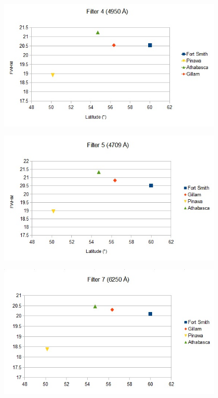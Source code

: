 \documentclass[11pt]{article}
\begin{document}
\begin{figure}[h!]
\includegraphics[scale=1.0]{filter4_FWHM.jpg}
\end{figure}

\begin{figure}[h!]
\includegraphics[scale=1.0]{filter5_FWHM.jpg}
\end{figure}

\begin{figure}[h!]
\includegraphics[scale=1.0]{filter7_FWHM.jpg}
\end{figure}
\end{document}
